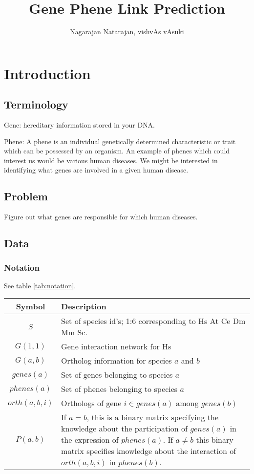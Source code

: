 \documentclass{report}
\title{Gene Phene Link Prediction}
\author{Nagarajan Natarajan, vishvAs vAsuki}
\begin{document}
\maketitle
\tableofcontents

\chapter{Introduction}
\section{Terminology}

Gene: hereditary information stored in your DNA.

Phene: A phene is an individual genetically determined characteristic or trait which can be possessed by an organism. An example of phenes which could interest us would be various human diseases. We might be interested in identifying what genes are involved in a given human disease.

\section{Problem}
Figure out what genes are responsible for which human diseases.

\section{Data}
\subsection{Notation}
See table \ref{tab:notation}.

\begin{table*}
\centering
\begin{tabular}{| c | p{8cm} |} \hline
Symbol & Description \\ \hline
$S$ & Set of species id's; 1:6 corresponding to Hs At Ce Dm Mm Sc. \\ \hline
$G(1,1)$ & Gene interaction network for Hs \\ \hline
$G(a,b)$ & Ortholog information for species $a$ and $b$ \\ \hline
$genes(a)$ & Set of genes belonging to species $a$ \\ \hline
$phenes(a)$ & Set of phenes belonging to species $a$ \\ \hline
$orth(a,b,i)$ & Orthologs of gene $i \in genes(a)$ among $genes(b)$ \\ \hline
$P(a,b)$ & If $a = b$, this is a binary matrix specifying the knowledge about the participation of $genes(a)$ in the expression of $phenes(a)$. If $a \neq b$ this binary matrix specifies knowledge about the interaction of $orth(a,b,i)$ in $phenes(b)$. \\ \hline
\end{tabular}
\caption{Notation}
\label{tab:notation}
\end{table*}
\end{document}

